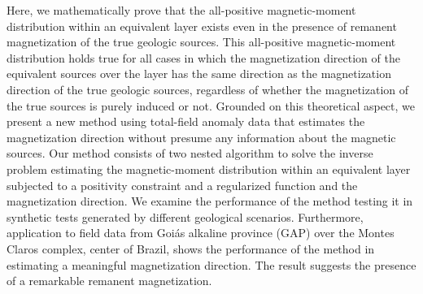 Here, we mathematically prove that the all-positive magnetic-moment distribution within an equivalent layer exists even in the presence of remanent magnetization of the true geologic sources. This all-positive magnetic-moment distribution holds true for all cases in which the magnetization direction of the equivalent sources over the layer has the same direction as the magnetization direction of the true geologic sources, regardless of whether the magnetization of the true sources is purely induced or not. Grounded on this theoretical aspect, we present a new method using total-field anomaly data that estimates the magnetization direction without presume any information about the magnetic sources. Our method consists of two nested algorithm to solve the inverse problem estimating the magnetic-moment distribution within an equivalent layer subjected to a positivity constraint and a regularized function and the magnetization direction. We examine the performance of the method testing it in synthetic tests generated by different geological scenarios. Furthermore, application to field data from Goi\'as alkaline province (GAP) over the Montes Claros complex, center of Brazil, shows the performance of the method in estimating a meaningful magnetization direction. The result suggests the presence of a remarkable remanent magnetization.    


